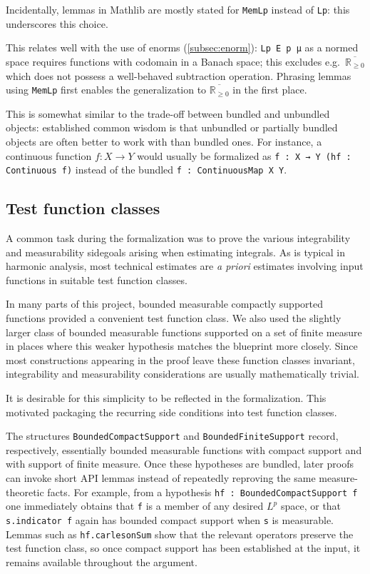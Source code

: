 \documentclass[12pt]{amsart}
\newcommand{\lean}[1]{\texttt{#1}}
\newcommand*{\real}{\mathbb{R}} %
\newcommand{\ennreal}{\overline{\real_{\ge0}}}
\begin{document}
Incidentally, lemmas in Mathlib are mostly stated for \lean{MemLp} instead of \lean{Lp}: this underscores this choice.

This relates well with the use of enorms (\ref{subsec:enorm}): \lean{Lp E p µ} as a normed space requires functions with codomain in a Banach space; this excludes e.g.\ $\ennreal$ which does not possess a well-behaved subtraction operation. Phrasing lemmas using \lean{MemLp} first enables the generalization to $\ennreal$ in the first place.

This is somewhat similar to the trade-off between bundled and unbundled objects: established common wisdom is that unbundled or partially bundled objects are often better to work with than bundled ones. For instance, a continuous function $f\colon X \to Y$ would usually be formalized as \lean{{f : X → Y} (hf : Continuous f)} instead of the bundled \lean{f : ContinuousMap X Y}.

\subsection{Test function classes}\label{subsec:bdd_comp_supp}
A common task during the formalization was to prove the various integrability and measurability sidegoals
arising when estimating integrals.
As is typical in harmonic analysis, most technical estimates are {\it a priori} estimates involving
input functions in suitable test function classes.

In many parts of this project, bounded measurable compactly supported functions provided a convenient
test function class. We also used the slightly larger class
of bounded measurable functions supported on a set of finite measure in places where this weaker hypothesis
matches the blueprint more closely.
Since most constructions appearing in the proof leave these function classes invariant,
integrability and measurability considerations are usually mathematically trivial.

It is desirable for this simplicity to be reflected in the formalization.
This motivated packaging the recurring side conditions into test function classes.

The structures \lean{BoundedCompactSupport} and \lean{BoundedFiniteSupport} record,
respectively, essentially bounded measurable functions with compact support and with support of finite measure.
Once these hypotheses are bundled, later proofs can invoke short API lemmas instead of repeatedly
reproving the same measure-theoretic facts. For example, from a hypothesis
\lean{hf : BoundedCompactSupport f} one immediately obtains that \lean{f} is a member of
any desired $L^p$ space, %
or that \lean{s.indicator f} again has bounded compact support when \lean{s} is measurable.
Lemmas such as \lean{hf.carlesonSum} show that the relevant
operators preserve the test function class, so once compact support has been established at the input, it remains available throughout the argument.
\end{document}
